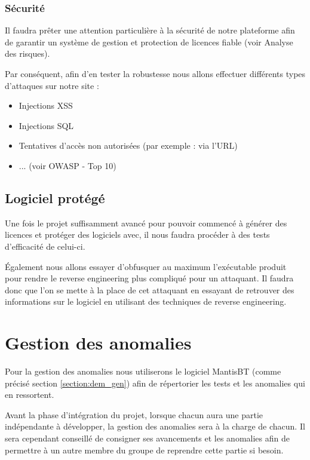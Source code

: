 \subsection{Sécurité}
Il faudra prêter une attention particulière à la sécurité de notre plateforme afin de garantir un système
de gestion et protection de licences fiable (voir Analyse des risques).

Par conséquent, afin d'en tester la robustesse nous allons effectuer différents types d'attaques sur notre site :
\begin{itemize}
    \item Injections XSS
    \item Injections SQL
    \item Tentatives d'accès non autorisées (par exemple : via l'URL)
    \item ... (voir OWASP - Top 10)
\end{itemize}


\section{Logiciel protégé}

Une fois le projet suffisamment avancé pour pouvoir commencé à générer des licences et protéger des logiciels
avec, il nous faudra procéder à des tests d'efficacité de celui-ci.

Également nous allons essayer d'obfusquer au maximum l'exécutable produit pour rendre le reverse engineering
plus compliqué pour un attaquant. Il faudra donc que l'on se mette à la place de cet attaquant en essayant
de retrouver des informations sur le logiciel en utilisant des techniques de reverse engineering.


\chapter{Gestion des anomalies}
Pour la gestion des anomalies nous utiliserons le logiciel MantisBT (comme précisé section
\ref{section:dem_gen}) afin de répertorier les tests et les anomalies qui en ressortent.\newline

Avant la phase d'intégration du projet, lorsque chacun aura une partie indépendante à développer,
la gestion des anomalies sera à la charge de chacun. Il sera cependant conseillé de consigner ses
avancements et les anomalies afin de permettre à un autre membre du groupe de reprendre cette
partie si besoin.\newline

